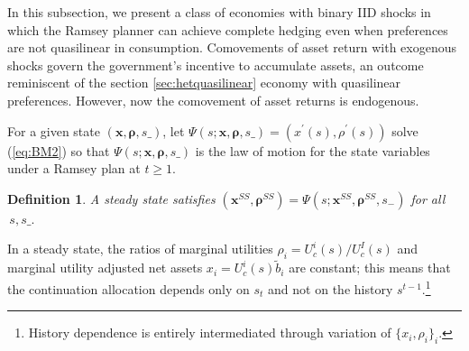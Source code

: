 \documentclass[thmsb,11pt]{article}
\newtheorem{definition}{Definition}
\begin{document}
In this  subsection, we  present  a class of  economies with binary IID shocks  in which  the Ramsey planner can achieve complete hedging even when preferences are not quasilinear in consumption. %
 Comovements of   asset return with exogenous shocks govern the government's incentive to accumulate assets, an outcome reminiscent of the section \ref{sec:hetquasilinear}  economy with quasilinear preferences.
However, now the comovement of asset returns is endogenous.

For a given state $\left(
\bm{x},\bm{\rho },s\_\right) $, let  $\Psi \left( s;\bm{x},%
\bm{\rho },s\_\right) =\left( x^{\prime }\left( s\right) ,\rho ^{\prime
}\left( s\right) \right) $  solve (\ref{eq:BM2}) so that $\Psi \left( s;\bm{x},\bm{\rho },s\_\right) $ is the law of motion for the state variables
under a Ramsey plan at $t \geq 1$.
\begin{definition} \label{defn: steady state}
 A steady state %
 satisfies $\left(\bm{ x}^{SS},\bm{\rho}
^{SS}\right) =\Psi \left( s;\bm{x}^{SS},\bm{\rho} ^{SS},s_{-}\right) $ for all $%
\,s,s\_.$
\end{definition}
In a steady state, the ratios  of marginal utilities  $\rho_i =U_{c}^{i}(s)/U_{c}^{I}(s)$ and marginal utility adjusted net assets $x_i=U^i_c(s)\tilde{b}_i$ are constant;
this means that the continuation allocation depends only on  $s_{t}$ and not on the  history $s^{t-1}$.\footnote{History dependence
is entirely intermediated through variation of $\{x_i,\rho_i\}_i$.}
\end{document}
